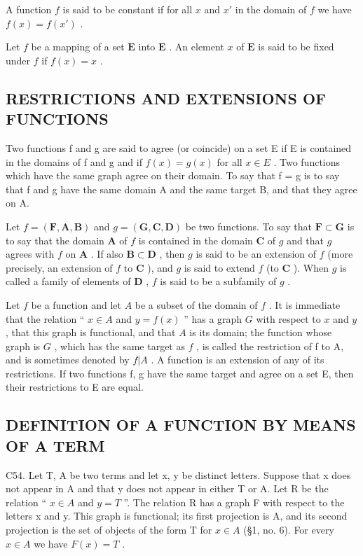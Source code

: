 A function \(f\) is said to be constant if for all \(x\) and \(x'\) in the domain of \(f\) we have \(f(x) = f(x')\) .

Let \(f\) be a mapping of a set \(\mathbf{E}\) into \(\mathbf{E}\) . An element \(x\) of \(\mathbf{E}\) is said to be fixed under \(f\) if \(f(x) = x\) .

\subsection{RESTRICTIONS AND EXTENSIONS OF FUNCTIONS}

Two functions f and g are said to agree (or coincide) on a set E if E is contained in the domains of f and g and if \(f(x) = g(x)\) for all \(x \in E\) . Two functions which have the same graph agree on their domain. To say that f = g is to say that f and g have the same domain A and the same target B, and that they agree on A.

Let \(f = (\mathbf{F}, \mathbf{A}, \mathbf{B})\) and \(g = (\mathbf{G}, \mathbf{C}, \mathbf{D})\) be two functions. To say that \(\mathbf{F} \subset \mathbf{G}\) is to say that the domain \(\mathbf{A}\) of \(f\) is contained in the domain \(\mathbf{C}\) of \(g\) and that \(g\) agrees with \(f\) on \(\mathbf{A}\) . If also \(\mathbf{B} \subset \mathbf{D}\) , then \(g\) is said to be an extension of \(f\) (more precisely, an extension of \(f\) to \(\mathbf{C}\) ), and \(g\) is said to extend \(f\) (to \(\mathbf{C}\) ). When \(g\) is called a family of elements of \(\mathbf{D}\) , \(f\) is said to be a subfamily of \(g\) .

Let \(f\) be a function and let \(A\) be a subset of the domain of \(f\) . It is immediate that the relation `` \(x \in A\) and \(y = f(x)\) '' has a graph \(G\) with respect to \(x\) and \(y\) , that this graph is functional, and that \(A\) is its domain; the function whose graph is \(G\) , which has the same target as \(f\) , is called the restriction of f to A, and is sometimes denoted by \(f|A\) . A function is an extension of any of its restrictions. If two functions f, g have the same target and agree on a set E, then their restrictions to E are equal.

\subsection{DEFINITION OF A FUNCTION BY MEANS OF A TERM}

C54. Let T, A be two terms and let x, y be distinct letters. Suppose that x does not appear in A and that y does not appear in either T or A. Let R be the relation `` \(x \in A\) and \(y = T\) ''. The relation R has a graph F with respect to the letters x and y. This graph is functional; its first projection is A, and its second projection is the set of objects of the form T for \(x \in A\) (§1, no. 6). For every \(x \in A\) we have \(F(x) = T\) .

